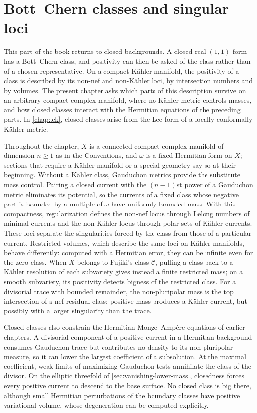 \chapter{Bott--Chern classes and singular loci}
\label{chap:bott-chern-loci}

\begingroup
{}

This part of the book returns to closed backgrounds. A closed real $(1,1)$-form has a Bott--Chern class, and positivity can then be asked of the class rather than of a chosen representative. On a compact K\"ahler manifold, the positivity of a class is described by its non-nef and non-K\"ahler loci, by intersection numbers and by volumes. The present chapter asks which parts of this description survive on an arbitrary compact complex manifold, where no K\"ahler metric controls masses, and how closed classes interact with the Hermitian equations of the preceding parts. In \cref{chap:lck}, closed classes arise from the Lee form of a locally conformally K\"ahler metric.

Throughout the chapter, $X$ is a connected compact complex manifold of dimension $n\geq1$ as in the Conventions, and $\omega$ is a fixed Hermitian form on $X$; sections that require a K\"ahler manifold or a special geometry say so at their beginning. Without a K\"ahler class, Gauduchon metrics provide the substitute mass control. Pairing a closed current with the $(n-1)$st power of a Gauduchon metric eliminates its potential, so the currents of a fixed class whose negative part is bounded by a multiple of $\omega$ have uniformly bounded mass. With this compactness, regularization defines the non-nef locus through Lelong numbers of minimal currents and the non-K\"ahler locus through polar sets of K\"ahler currents. These loci separate the singularities forced by the class from those of a particular current. Restricted volumes, which describe the same loci on K\"ahler manifolds, behave differently: computed with a Hermitian error, they can be infinite even for the zero class. When $X$ belongs to Fujiki's class $\mathcal C$, pulling a class back to a K\"ahler resolution of each subvariety gives instead a finite restricted mass; on a smooth subvariety, its positivity detects bigness of the restricted class. For a divisorial trace with bounded remainder, the non-pluripolar mass is the top intersection of a nef residual class; positive mass produces a K\"ahler current, but possibly with a larger singularity than the trace.

Closed classes also constrain the Hermitian Monge--Amp\`ere equations of earlier chapters. A divisorial component of a positive current in a Hermitian background consumes Gauduchon trace but contributes no density to its non-pluripolar measure, so it can lower the largest coefficient of a subsolution. At the maximal coefficient, weak limits of maximizing Gauduchon tests annihilate the class of the divisor. On the elliptic threefold of \cref{sec:vanishing-lower-mass}, closedness forces every positive current to descend to the base surface. No closed class is big there, although small Hermitian perturbations of the boundary classes have positive variational volume, whose degeneration can be computed explicitly.

